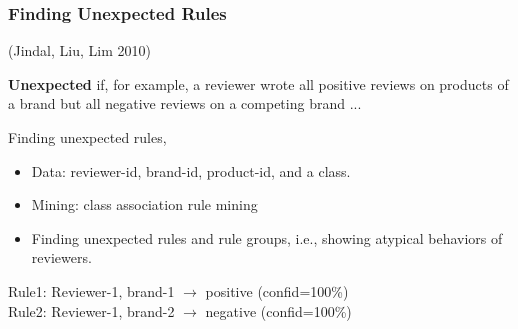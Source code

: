\documentclass[t]{beamer}
\begin{document}
\begin{frame} \frametitle{Finding Unexpected Rules} %

(Jindal, Liu, Lim 2010)

\vfill
\textbf{Unexpected} if, for example, a reviewer wrote all positive reviews on products of a
brand but all negative reviews on a competing brand ...

\vfill

Finding unexpected rules,
\begin{itemize}
\item Data: reviewer-id, brand-id, product-id, and a class. 

\item Mining: class association rule mining 

\item Finding unexpected rules and rule groups, i.e., showing atypical behaviors of reviewers.
\end{itemize}

\begin{block}{}
Rule1: Reviewer-1, brand-1 $\rightarrow$ positive (confid=100\%) \\
Rule2: Reviewer-1, brand-2 $\rightarrow$ negative (confid=100\%)
\end{block}

\end{frame}

\end{document}
